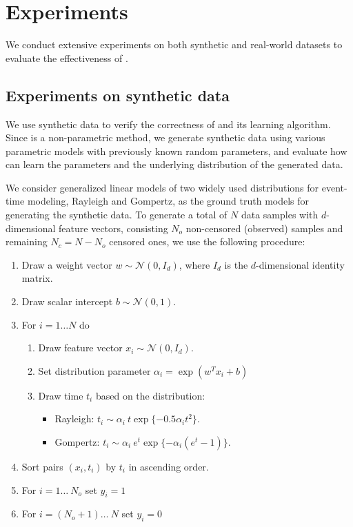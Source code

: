 \section{Experiments}\label{sec:results}

We conduct extensive experiments on both synthetic and real-world datasets to evaluate the effectiveness of \npglm.

\subsection{Experiments on synthetic data}
We use synthetic data to verify the correctness of \npglm and its learning algorithm. Since \npglm is a non-parametric method, we generate synthetic data using various parametric models with previously known random parameters, and evaluate how can \npglm learn the parameters and the underlying distribution of the generated data.

We consider generalized linear models of two widely used distributions for event-time modeling, Rayleigh and Gompertz, as the ground truth models for generating the synthetic data. To generate a total of $N$ data samples with $d$-dimensional feature vectors, consisting $N_o$ non-censored (observed) samples and remaining $N_c=N-N_o$ censored ones, we use the following procedure:

\begin{enumerate}
\item Draw a weight vector $w\sim\mathcal{N}(0,I_d)$, where $I_d$ is the $d$-dimensional identity matrix.
\item Draw scalar intercept $b\sim\mathcal{N}(0,1)$.
\item For $i=1\dots N$ do 
\begin{enumerate}[i]
\item Draw feature vector $x_i\sim\mathcal{N}(0,I_d)$.
\item Set distribution parameter $\alpha_i=\exp(w^Tx_i+b)$
\item Draw time $t_i$ based on the distribution:
\begin{itemize}
    \item[] Rayleigh: $t_i\sim\alpha_i~t\exp\{-0.5\alpha_it^2\}$.
    \item[] Gompertz: $t_i\sim\alpha_i~e^t\exp\{-\alpha_i(e^t-1)\}$.
\end{itemize}
\end{enumerate}
\item Sort pairs $(x_i,t_i)$ by $t_i$ in ascending order.
\item For $i=1\dots~N_o$ set $y_i=1$
\item For $i=(N_o+1)\dots~N$ set $y_i=0$
\end{enumerate}

